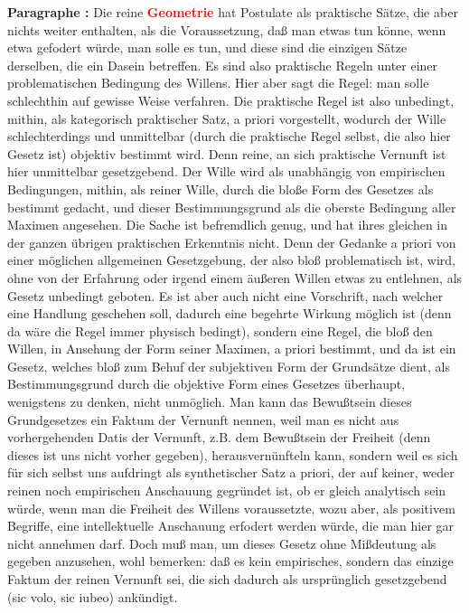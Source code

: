 \documentclass[a4paper,12pt,twoside]{book}
\newcommand{\match}[1]{\textcolor{red}{\textbf{#1}}}
\begin{document}
	\noindent\textbf{Paragraphe : }Die reine \match{Geometrie} hat Postulate als praktische Sätze, die aber nichts weiter enthalten, als die Voraussetzung, daß man etwas tun könne, wenn etwa gefodert würde, man solle es tun, und diese sind die einzigen Sätze derselben, die ein Dasein betreffen. Es sind also praktische Regeln unter einer problematischen Bedingung des Willens. Hier aber sagt die Regel: man solle schlechthin auf gewisse Weise verfahren. Die praktische Regel ist also unbedingt, mithin, als kategorisch praktischer Satz, a priori vorgestellt, wodurch der Wille schlechterdings und unmittelbar (durch die praktische Regel selbst, die also hier Gesetz ist) objektiv bestimmt wird. Denn reine, an sich praktische Vernunft ist hier unmittelbar gesetzgebend. Der Wille wird als unabhängig von empirischen Bedingungen, mithin, als reiner Wille, durch die bloße Form des Gesetzes als bestimmt gedacht, und dieser Bestimmungsgrund als die oberste Bedingung aller Maximen angesehen. Die Sache ist befremdlich genug, und hat ihres gleichen in der ganzen übrigen praktischen Erkenntnis nicht. Denn der Gedanke a priori von einer möglichen allgemeinen Gesetzgebung, der also bloß problematisch ist, wird, ohne von der Erfahrung oder irgend einem äußeren Willen etwas zu entlehnen, als Gesetz unbedingt geboten. Es ist aber auch nicht eine Vorschrift, nach welcher eine Handlung geschehen soll, dadurch eine begehrte Wirkung möglich ist (denn da wäre die Regel immer physisch bedingt), sondern eine Regel, die bloß den Willen, in Ansehung der Form seiner Maximen, a priori bestimmt, und da ist ein Gesetz, welches bloß zum Behuf der subjektiven Form der Grundsätze dient, als Bestimmungsgrund durch die objektive Form eines Gesetzes überhaupt, wenigstens zu denken, nicht unmöglich. Man kann das Bewußtsein dieses Grundgesetzes ein Faktum der Vernunft nennen, weil man es nicht aus vorhergehenden Datis der Vernunft, z.B. dem Bewußtsein der Freiheit (denn dieses ist uns nicht vorher gegeben), herausvernünfteln kann, sondern weil es sich für sich selbst uns aufdringt als  synthetischer Satz a priori, der auf keiner, weder reinen noch empirischen Anschauung gegründet ist, ob er gleich analytisch sein würde, wenn man die Freiheit des Willens voraussetzte, wozu aber, als positivem Begriffe, eine intellektuelle Anschauung erfodert werden würde, die man hier gar nicht annehmen darf. Doch muß man, um dieses Gesetz ohne Mißdeutung als gegeben anzusehen, wohl bemerken: daß es kein empirisches, sondern das einzige Faktum der reinen Vernunft sei, die sich dadurch als ursprünglich gesetzgebend (sic volo, sic iubeo) ankündigt. 
	
\end{document}
